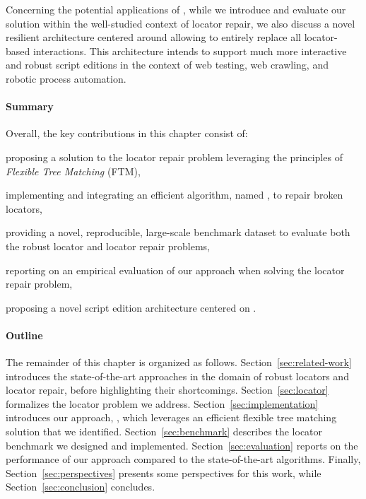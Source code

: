 Concerning the potential applications of \erratum, while we introduce and evaluate our solution within the well-studied context of locator repair, we also discuss a novel resilient architecture centered around \erratum allowing to entirely replace all locator-based interactions.
This architecture intends to support much more interactive and robust script editions in the context of web testing, web crawling, and robotic process automation.

\paragraph{Summary}
Overall, the key contributions in this chapter consist of:
\begin{compactenum}
    \item proposing a solution to the locator repair problem leveraging the principles of \emph{Flexible Tree Matching} (FTM),
    \item implementing and integrating an efficient algorithm, named \erratum, to repair broken locators,
    \item providing a novel, reproducible, large-scale benchmark dataset to evaluate both the robust locator and locator repair problems,
    \item reporting on an empirical evaluation of our approach when solving the locator repair problem,
    \item proposing a novel script edition architecture centered on \erratum.
\end{compactenum}

\paragraph{Outline}
The remainder of this chapter is organized as follows.
Section~\ref{sec:related-work} introduces the state-of-the-art approaches in the domain of robust locators and locator repair, before highlighting their shortcomings.
Section~\ref{sec:locator} formalizes the locator problem we address.
Section~\ref{sec:implementation} introduces our approach, \erratum, which leverages an efficient flexible tree matching solution that we identified.
Section~\ref{sec:benchmark} describes the locator benchmark we designed and implemented.
Section~\ref{sec:evaluation} reports on the performance of our approach compared to the state-of-the-art algorithms.
Finally, Section~\ref{sec:perspectives} presents some perspectives for this work, while Section~\ref{sec:conclusion} concludes.

